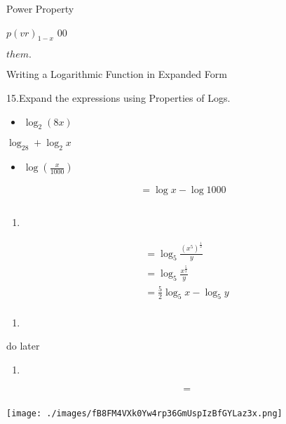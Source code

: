 \documentclass{book}
\begin{document}
Power Property

\(p(vr)_{1-x}\) 00

\(them.\)

Writing a Logarithmic Function in Expanded Form

15.Expand the expressions using Properties of Logs.

\begin{itemize}
	\tightlist
	\item
	      \(\log_2(8x)\)
\end{itemize}

\(\log_28+\log_2x\)

\begin{itemize}
	\tightlist
	\item
	      \(\log (\frac{x}{1000})\)
\end{itemize}


	\begin{align}
		= \log x - \log 1000 \\ \\
	\end{align}


\begin{enumerate}
	\def\labelenumi{\alph{enumi}.}
	\setcounter{enumi}{3}
	\tightlist
	\item
\end{enumerate}


	\begin{align}
		 & = \log_5 \frac{(x^5)^\frac{1}{2}}{y} \\&= \log_5 \frac{x^\frac{5}{2}}{y} \\&= \frac{5}{2} \log_5x - \log_5 y \\
	\end{align}


\begin{enumerate}
	\def\labelenumi{\alph{enumi}.}
	\setcounter{enumi}{4}
	\tightlist
	\item
\end{enumerate}

do later

\begin{enumerate}
	\def\labelenumi{\alph{enumi}.}
	\setcounter{enumi}{5}
	\tightlist
	\item
\end{enumerate}


	\begin{align}
		 & = \\
	\end{align}


\texttt{[image: ./images/fB8FM4VXk0Yw4rp36GmUspIzBfGYLaz3x.png]}
\end{document}
